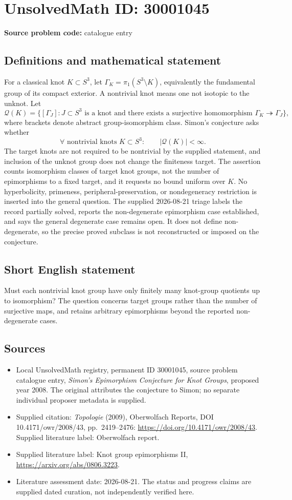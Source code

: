 \documentclass[11pt]{article}
\begin{document}
\section*{UnsolvedMath ID: 30001045}
\textbf{Source problem code:} catalogue entry
\subsection{Definitions and mathematical statement}
For a classical knot $K\subset S^3$, let $\Gamma_K=\pi_1(S^3\setminus K)$, equivalently the fundamental group of its compact exterior. A nontrivial knot means one not isotopic to the unknot. Let \[\mathcal Q(K)=\{[\Gamma_J]:J\subset S^3\text{ is a knot and there exists a surjective homomorphism }\Gamma_K\twoheadrightarrow\Gamma_J\},\] where brackets denote abstract group-isomorphism class. Simon's conjecture asks whether \[\forall\text{ nontrivial knots }K\subset S^3:\qquad |\mathcal Q(K)|<\infty.\] The target knots are not required to be nontrivial by the supplied statement, and inclusion of the unknot group does not change the finiteness target. The assertion counts isomorphism classes of target knot groups, not the number of epimorphisms to a fixed target, and it requests no bound uniform over $K$. No hyperbolicity, primeness, peripheral-preservation, or nondegeneracy restriction is inserted into the general question. The supplied 2026-08-21 triage labels the record partially solved, reports the non-degenerate epimorphism case established, and says the general degenerate case remains open. It does not define non-degenerate, so the precise proved subclass is not reconstructed or imposed on the conjecture.
\subsection{Short English statement}
Must each nontrivial knot group have only finitely many knot-group quotients up to isomorphism? The question concerns target groups rather than the number of surjective maps, and retains arbitrary epimorphisms beyond the reported non-degenerate cases.
\subsection{Sources}
\begin{itemize}\item Local UnsolvedMath registry, permanent ID 30001045, source problem catalogue entry, \emph{Simon's Epimorphism Conjecture for Knot Groups}, proposed year 2008. The original attributes the conjecture to Simon; no separate individual proposer metadata is supplied.\item Supplied citation: \emph{Topologie} (2009), Oberwolfach Reports, DOI 10.4171/owr/2008/43, pp.\ 2419--2476: \url{https://doi.org/10.4171/owr/2008/43}. Supplied literature label: Oberwolfach report.\item Supplied literature label: Knot group epimorphisms II, \url{https://arxiv.org/abs/0806.3223}.\item Literature assessment date: 2026-08-21. The status and progress claims are supplied dated curation, not independently verified here.\end{itemize}
\end{document}
